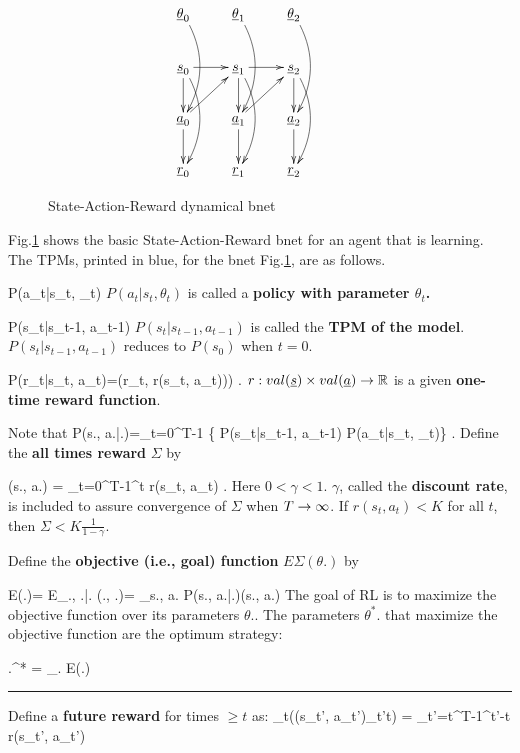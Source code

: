 \begin{figure}
\centering
$$\xymatrix{
\rvtheta_0\ar@/^1pc/[dd]&
\rvtheta_1\ar@/^1pc/[dd]&
\rvtheta_2\ar@/^1pc/[dd]&\\
\rvs_0\ar[r]\ar[d]\ar@/^1pc/[dd]&
\rvs_1\ar[r]\ar[d]\ar@/^1pc/[dd]&
\rvs_2\ar[d]\ar@/^1pc/[dd]\\
\rva_0\ar[ur]\ar[d]&
\rva_1\ar[ur]\ar[d]&
\rva_2\ar[d]
\\
\rvr_0&
\rvr_1&
\rvr_2
}$$
\caption{State-Action-Reward dynamical bnet}
\label{fig-basic-rl}
\end{figure}

Fig.\ref{fig-basic-rl} shows
the basic State-Action-Reward bnet
for an agent that is learning.
The TPMs, printed in blue, for the
bnet Fig.\ref{fig-basic-rl}, are
as follows.

\beq\color{blue}P(a_t|s_t, \theta_t)
\eeq
 $P(a_t|s_t, \theta_t)$ is called  a
{\bf policy with parameter $\theta_t$.} 

\beq\color{blue}P(s_{t}|s_{t-1}, a_{t-1})
\eeq
$P(s_t|s_{t-1}, a_{t-1})$ is called the
 {\bf TPM of the model}.
$P(s_t|s_{t-1}, a_{t-1})$ reduces to $P(s_0)$ when $t=0$.

\beq\color{blue}
P(r_t|s_t, a_t)=\delta(r_t, r(s_t, a_t)))
\;.\eeq
$r:val(\rvs)\times val(\rva)\rarrow \RR$
is a given
 {\bf one-time reward function}.


Note that 
\beq
P(s., a.|\theta.)=\prod_{t=0}^{T-1}
\{
P(s_t|s_{t-1}, a_{t-1})
P(a_t|s_t, \theta_t)\}
\;.
\eeq
Define the {\bf all times reward} 
$\Sigma$ by

\beq
\Sigma(s., a.) = 
\sum_{t=0}^{T-1}\gamma^t r(s_t, a_t)
\;.
\eeq
Here $0<\gamma<1$. 
$\gamma$, called the {\bf discount rate},
is included to assure 
convergence of $\Sigma$ when
$T\rightarrow \infty$. 
If $r(s_t, a_t)< K$ for all $t$, then
$\Sigma< K \frac{1}{1-\gamma}$.

Define the {\bf objective (i.e., goal)
 function}
$E\Sigma(\theta.)$ by

\beq
E\Sigma(\theta.)=
E_{\rvs., \rva.|\theta.}
\Sigma(\rvs., \rva.)=
\sum_{s., a.}
P(s., a.|\theta.)\Sigma(s., a.)
\eeq
The goal of RL  is to
maximize the 
objective function over
its parameters $\theta.$.
The parameters $\theta^*.$ that 
maximize the objective function 
are the optimum strategy:

\beq 
\theta.^* = \argmax_{\theta.}
E\Sigma(\theta.)
\eeq

\hrule
Define a {\bf future reward} for
 times $\geq t$ as:
\beq
\Sigma_{\geq t}((s_{t'},
 a_{t'})_{t'\geq t}) =
 \sum_{t'=t}^{T-1}\gamma^{t'-t} r(s_{t'}, a_{t'})
\eeq

